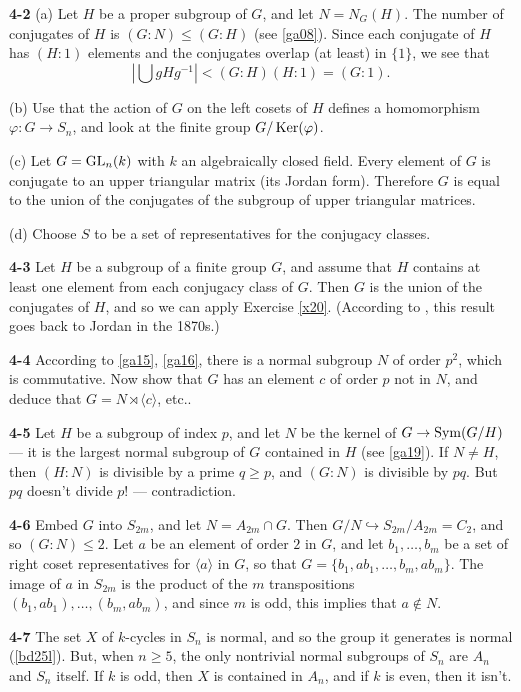 \documentclass[a4paper,11pt,final]{memoir}%
\theoremstyle{nonumberplain}
\begin{document}
\bigskip\noindent\textbf{4-2}
(a) Let $H$ be a proper subgroup of $G$, and let $N=N_{G}(H)$. The number of
conjugates of $H$ is $(G:N)\leq(G:H)$ (see \ref{ga08}). Since each conjugate
of $H$ has $(H:1)$ elements and the conjugates overlap (at least) in $\{1\}$,
we see that
\[
\left\vert \bigcup gHg^{-1}\right\vert <(G:H)(H:1)=(G:1).
\]\par
(b) Use that the action of  $G$ on the left cosets of $H$ defines a homomorphism $\varphi\colon G\to S_n$, and
look at the finite group $G/\operatorname{Ker}(\varphi)$.\par
(c)  Let $G=\operatorname{GL}_n(k)$
with $k$ an algebraically closed field. Every element of $G$
is conjugate to an upper triangular matrix (its Jordan form). Therefore
$G$ is equal to the union of the conjugates of the subgroup of upper triangular matrices.\par
(d) Choose $S$ to be a set of representatives for the
conjugacy classes.

\bigskip\noindent\textbf{4-3}
Let $H$ be a subgroup of a finite group $G$, and assume that $H$ contains at
least one element from each conjugacy class of $G$. Then $G$ is the union of
the conjugates of $H$, and so we can apply Exercise \ref{x20}.
(According to \cite{serre2003}, this result goes back to Jordan in the 1870s.)

\bigskip\noindent\textbf{4-4}
According to \ref{ga15}, \ref{ga16}, there is a normal subgroup $N$ of order
$p^{2}$, which is commutative. Now show that $G$ has an element $c$ of order
$p$ not in $N$, and deduce that $G=N\rtimes\langle c\rangle$, etc..

\bigskip\noindent\textbf{4-5}
Let $H$ be a subgroup of index $p$, and let $N$ be the kernel of
$G\rightarrow\operatorname{Sym}(G/H)$ --- it is the largest normal subgroup of $G$ contained
in $H$ (see \ref{ga19}). If $N\neq H$, then $(H:N)$ is divisible by a prime
$q\geq p$, and $(G:N)$ is divisible by $pq$. But $pq$ doesn't divide $p!$ --- contradiction.

\bigskip\noindent\textbf{4-6}
Embed $G$ into $S_{2m}$, and let $N=A_{2m}\cap G$. Then $G/N\hookrightarrow
S_{2m}/A_{2m}=C_{2}$, and so $(G:N)\leq2$. Let $a$ be an element of order $2$
in $G$, and let $b_{1},\ldots,b_{m}$ be a set of right coset representatives
for $\langle a\rangle$ in $G$, so that $G=\{b_{1},ab_{1},\ldots,b_{m}%
,ab_{m}\}$. The image of $a$ in $S_{2m}$ is the product of the $m$
transpositions $(b_{1},ab_{1}),\ldots,(b_{m},ab_{m})$, and since $m$ is odd,
this implies that $a\notin N$.

\bigskip\noindent\textbf{4-7}
The set $X$ of $k$-cycles in $S_{n}$ is normal, and so the group it generates
is normal (\ref{bd25l}). But, when $n\geq5$, the only nontrivial normal
subgroups of $S_{n}$ are $A_{n}$ and $S_{n}$ itself. If $k$ is odd, then $X$
is contained in $A_{n}$, and if $k$ is even, then it isn't.
\end{document}
